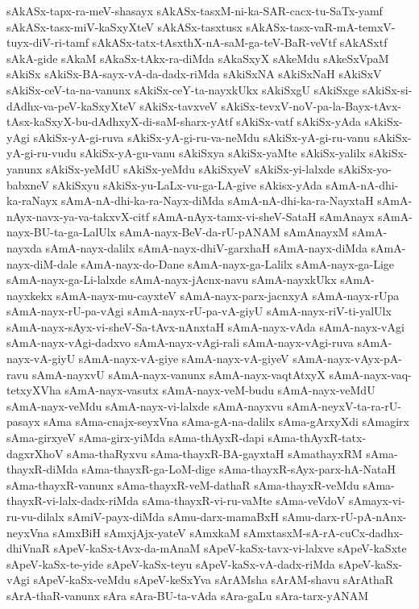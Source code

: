 {sAkASx-tapx-ra-meV-shasayx
sAkASx-tasxM-ni-ka-SAR-cacx-tu-SaTx-yamf
sAkASx-tasx-miV-kaSxyXteV
sAkASx-tasxtusx
sAkASx-tasx-vaR-mA-temxV-tuyx-diV-ri-tamf
sAkASx-tatx-tAsxthX-nA-saM-ga-teV-BaR-veVtf
sAkASxtf
sAkA-gide
sAkaM
sAkaSx-tAkx-ra-diMda
sAkaSxyX
sAkeMdu
sAkeSxVpaM
sAkiSx
sAkiSx-BA-sayx-vA-da-dadx-riMda
sAkiSxNA
sAkiSxNaH
sAkiSxV
sAkiSx-ceV-ta-na-vanunx
sAkiSx-ceY-ta-nayxkUkx
sAkiSxgU
sAkiSxge
sAkiSx-si-dAdhx-va-peV-kaSxyXteV
sAkiSx-tavxveV
sAkiSx-tevxV-noV-pa-la-Bayx-tAvx-tAsx-kaSxyX-bu-dAdhxyX-di-saM-sharx-yAtf
sAkiSx-vatf
sAkiSx-yAda
sAkiSx-yAgi
sAkiSx-yA-gi-ruva
sAkiSx-yA-gi-ru-va-neMdu
sAkiSx-yA-gi-ru-vanu
sAkiSx-yA-gi-ru-vudu
sAkiSx-yA-gu-vanu
sAkiSxya
sAkiSx-yaMte
sAkiSx-yalilx
sAkiSx-yanunx
sAkiSx-yeMdU
sAkiSx-yeMdu
sAkiSxyeV
sAkiSx-yi-lalxde
sAkiSx-yo-babxneV
sAkiSxyu
sAkiSx-yu-LaLx-vu-ga-LA-give
sAkisx-yAda
sAmA-nA-dhi-ka-raNayx
sAmA-nA-dhi-ka-ra-Nayx-diMda
sAmA-nA-dhi-ka-ra-NayxtaH
sAmA-nAyx-navx-ya-va-takxvX-citf
sAmA-nAyx-tamx-vi-sheV-SataH
sAmAnayx
sAmA-nayx-BU-ta-ga-LalUlx
sAmA-nayx-BeV-da-rU-pANAM
sAmAnayxM
sAmA-nayxda
sAmA-nayx-dalilx
sAmA-nayx-dhiV-garxhaH
sAmA-nayx-diMda
sAmA-nayx-diM-dale
sAmA-nayx-do-Dane
sAmA-nayx-ga-Lalilx
sAmA-nayx-ga-Lige
sAmA-nayx-ga-Li-lalxde
sAmA-nayx-jAcnx-navu
sAmA-nayxkUkx
sAmA-nayxkekx
sAmA-nayx-mu-cayxteV
sAmA-nayx-parx-jacnxyA
sAmA-nayx-rUpa
sAmA-nayx-rU-pa-vAgi
sAmA-nayx-rU-pa-vA-giyU
sAmA-nayx-riV-ti-yalUlx
sAmA-nayx-sAyx-vi-sheV-Sa-tAvx-nAnxtaH
sAmA-nayx-vAda
sAmA-nayx-vAgi
sAmA-nayx-vAgi-dadxvo
sAmA-nayx-vAgi-rali
sAmA-nayx-vAgi-ruva
sAmA-nayx-vA-giyU
sAmA-nayx-vA-giye
sAmA-nayx-vA-giyeV
sAmA-nayx-vAyx-pA-ravu
sAmA-nayxvU
sAmA-nayx-vanunx
sAmA-nayx-vaqtAtxyX
sAmA-nayx-vaq-tetxyXVha
sAmA-nayx-vasutx
sAmA-nayx-veM-budu
sAmA-nayx-veMdU
sAmA-nayx-veMdu
sAmA-nayx-vi-lalxde
sAmA-nayxvu
sAmA-neyxV-ta-ra-rU-pasayx
sAma
sAma-cnajx-seyxVna
sAma-gA-na-dalilx
sAma-gArxyXdi
sAmagirx
sAma-girxyeV
sAma-girx-yiMda
sAma-thAyxR-dapi
sAma-thAyxR-tatx-dagxrXhoV
sAma-thaRyxvu
sAma-thayxR-BA-gayxtaH
sAmathayxRM
sAma-thayxR-diMda
sAma-thayxR-ga-LoM-dige
sAma-thayxR-sAyx-parx-hA-NataH
sAma-thayxR-vanunx
sAma-thayxR-veM-dathaR
sAma-thayxR-veMdu
sAma-thayxR-vi-lalx-dadx-riMda
sAma-thayxR-vi-ru-vaMte
sAma-veVdoV
sAmayx-vi-ru-vu-dilalx
sAmiV-payx-diMda
sAmu-darx-mamaBxH
sAmu-darx-rU-pA-nAnx-neyxVna
sAmxBiH
sAmxjAjx-yateV
sAmxkaM
sAmxtasxM-sA-rA-cuCx-dadhx-dhiVnaR
sApeV-kaSx-tAvx-da-mAnaM
sApeV-kaSx-tavx-vi-lalxve
sApeV-kaSxte
sApeV-kaSx-te-yide
sApeV-kaSx-teyu
sApeV-kaSx-vA-dadx-riMda
sApeV-kaSx-vAgi
sApeV-kaSx-veMdu
sApeV-keSxYva
sArAMsha
sArAM-shavu
sArAthaR
sArA-thaR-vanunx
sAra
sAra-BU-ta-vAda
sAra-gaLu
sAra-tarx-yANAM
}
